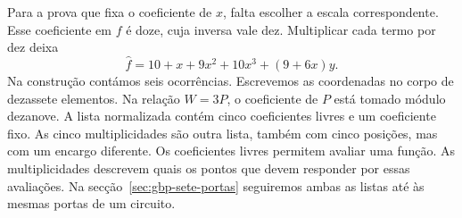 \begin{center}
\end{center}

Para a prova que fixa o coeficiente de \(x\), falta escolher a
escala correspondente. Esse coeficiente em \(f\) é doze, cuja
inversa vale dez. Multiplicar cada termo por dez deixa
\begin{equation}
 \widehat f=10+x+9x^2+10x^3+(9+6x)y .
 \label{eq:divisors-six-normalized}
\end{equation}
Na construção contámos seis ocorrências. Escrevemos as coordenadas
no corpo de dezassete elementos. Na relação \(W=3P\),
o coeficiente de \(P\) está tomado módulo dezanove. A lista
normalizada contém cinco coeficientes livres e um coeficiente fixo.
As cinco multiplicidades são outra lista, também com cinco
posições, mas com um encargo diferente. Os coeficientes livres
permitem avaliar uma função. As multiplicidades descrevem quais os
pontos que devem responder por essas avaliações. Na
secção~\ref{sec:gbp-sete-portas} seguiremos ambas as listas até às
mesmas portas de um circuito.
